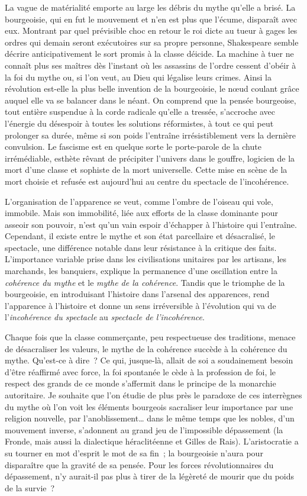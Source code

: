\documentclass[french,twoside]{book} %
\begin{document}
\noindent La vague de matérialité emporte au large les débris du mythe qu’elle a brisé. La bourgeoisie, qui en fut le mouvement et n’en est plus que l’écume, disparaît avec eux. Montrant par quel prévisible choc en retour le roi dicte au tueur à gages les ordres qui demain seront exécutoires sur sa propre personne, Shakespeare semble décrire anticipativement le sort promis à la classe déicide. La machine à tuer ne connaît plus ses maîtres dès l’instant où les assassins de l’ordre cessent d’obéir à la foi du mythe ou, si l’on veut, au Dieu qui légalise leurs crimes. Ainsi la révolution est-elle la plus belle invention de la bourgeoisie, le nœud coulant grâce auquel elle va se balancer dans le néant. On comprend que la pensée bourgeoise, tout entière suspendue à la corde radicale qu’elle a tressée, s’accroche avec l’énergie du désespoir à toutes les solutions réformistes, à tout ce qui peut prolonger sa durée, même si son poids l’entraîne irrésistiblement vers la dernière convulsion. Le fascisme est en quelque sorte le porte-parole de la chute irrémédiable, esthète rêvant de précipiter l’univers dans le gouffre, logicien de la mort d’une classe et sophiste de la mort universelle. Cette mise en scène de la mort choisie et refusée est aujourd’hui au centre du spectacle de l’incohérence.\par
L’organisation de l’apparence se veut, comme l’ombre de l’oiseau qui vole, immobile. Mais son immobilité, liée aux efforts de la classe dominante pour asseoir son pouvoir, n’est qu’un vain espoir d’échapper à l’histoire qui l’entraîne. Cependant, il existe entre le mythe et son état parcellaire et désacralisé, le spectacle, une différence notable dans leur résistance à la critique des faits. L’importance variable prise dans les civilisations unitaires par les artisans, les marchands, les banquiers, explique la permanence d’une oscillation entre la \emph{cohérence du mythe} et le \emph{mythe de la cohérence}. Tandis que le triomphe de la bourgeoisie, en introduisant l’histoire dans l’arsenal des apparences, rend l’apparence à l’histoire et donne un sens irréversible à l’évolution qui va de l’\emph{incohérence du spectacle} au \emph{spectacle de l’incohérence}.\par
Chaque fois que la classe commerçante, peu respectueuse des traditions, menace de désacraliser les valeurs, le mythe de la cohérence succède à la cohérence du mythe. Qu’est-ce à dire ? Ce qui, jusque-là, allait de soi a soudainement besoin d’être réaffirmé avec force, la foi spontanée le cède à la profession de foi, le respect des grands de ce monde s’affermit dans le principe de la monarchie autoritaire. Je souhaite que l’on étudie de plus près le paradoxe de ces interrègnes du mythe où l’on voit les éléments bourgeois sacraliser leur importance par une religion nouvelle, par l’anoblissement… dans le même temps que les nobles, d’un mouvement inverse, s’adonnent au grand jeu de l’impossible dépassement (la Fronde, mais aussi la dialectique héraclitéenne et Gilles de Rais). L’aristocratie a su tourner en mot d’esprit le mot de sa fin ; la bourgeoisie n’aura pour disparaître que la gravité de sa pensée. Pour les forces révolutionnaires du dépassement, n’y aurait-il pas plus à tirer de la légèreté de mourir que du poids de la survie ?\par
\end{document}
